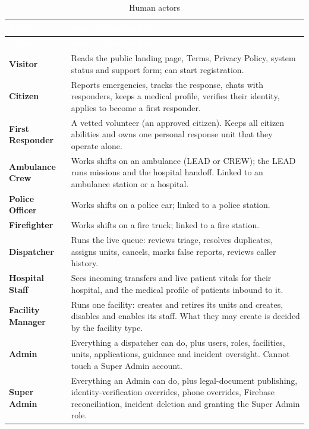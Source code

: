 {\tabfont\rowband
\begin{longtable}{@{}>{\raggedright\arraybackslash}p{}>{\raggedright\arraybackslash}p{}@{}}
\caption{Human actors}\label{tab:actors}\\
\rowcolor{najdanavy}\textcolor{white}{\sffamily\bfseries\small Actor} & \textcolor{white}{\sffamily\bfseries\small Role in the platform}\\
\endfirsthead
\rowcolor{najdanavy}\textcolor{white}{\sffamily\bfseries\small Actor} & \textcolor{white}{\sffamily\bfseries\small Role in the platform}\\
\endhead
\bottomrule\endlastfoot
\textbf{Visitor} & Reads the public landing page, Terms, Privacy Policy, system status and support form; can start registration.\\
\textbf{Citizen} & Reports emergencies, tracks the response, chats with responders, keeps a medical profile, verifies their identity, applies to become a first responder.\\
\textbf{First Responder} & A vetted volunteer (an approved citizen). Keeps all citizen abilities and owns one personal response unit that they operate alone.\\
\textbf{Ambulance Crew} & Works shifts on an ambulance (LEAD or CREW); the LEAD runs missions and the hospital handoff. Linked to an ambulance station or a hospital.\\
\textbf{Police Officer} & Works shifts on a police car; linked to a police station.\\
\textbf{Firefighter} & Works shifts on a fire truck; linked to a fire station.\\
\textbf{Dispatcher} & Runs the live queue: reviews triage, resolves duplicates, assigns units, cancels, marks false reports, reviews caller history.\\
\textbf{Hospital Staff} & Sees incoming transfers and live patient vitals for their hospital, and the medical profile of patients inbound to it.\\
\textbf{Facility Manager} & Runs one facility: creates and retires its units and creates, disables and enables its staff. What they may create is decided by the facility type.\\
\textbf{Admin} & Everything a dispatcher can do, plus users, roles, facilities, units, applications, guidance and incident oversight. Cannot touch a Super Admin account.\\
\textbf{Super Admin} & Everything an Admin can do, plus legal-document publishing, identity-verification overrides, phone overrides, Firebase reconciliation, incident deletion and granting the Super Admin role.\\
\end{longtable}}
